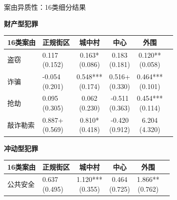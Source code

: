 \documentclass[aspectratio=169,10pt]{ctexbeamer}
\begin{document}
\begin{frame}[plain]{案由异质性：16类细分结果}
  \centering
  \scriptsize
  \begin{minipage}[t]{0.48\textwidth}
    \centering
    \textbf{财产型犯罪}
    \vspace{0.25em}
    \begin{tabular}{llcccc}
      \toprule
      16类案由 & 正规街区 & 城中村 & 中心 & 外围 \\
      \midrule
      盗窃 & \makecell{0.117\\(0.152)} & \makecell{0.163*\\(0.086)} & \makecell{0.183\\(0.181)} & \makecell{0.120**\\(0.058)} \\
      诈骗 & \makecell{-0.054\\(0.201)} & \makecell{0.548***\\(0.174)} & \makecell{0.516+\\(0.330)} & \makecell{0.464***\\(0.101)} \\
      抢劫 & \makecell{0.095\\(0.305)} & \makecell{0.062\\(0.230)} & \makecell{-0.511\\(0.363)} & \makecell{0.454***\\(0.114)} \\
      敲诈勒索 & \makecell{0.887+\\(0.569)} & \makecell{0.810*\\(0.418)} & \makecell{-0.420\\(0.912)} & \makecell{6.204\\(4.320)} \\
      \bottomrule
    \end{tabular}
  \end{minipage}
  \hfill
  \begin{minipage}[t]{0.48\textwidth}
    \centering
    \textbf{冲动型犯罪}
    \vspace{0.25em}
    \begin{tabular}{llcccc}
      \toprule
      16类案由 & 正规街区 & 城中村 & 中心 & 外围 \\
      \midrule
      公共安全 & \makecell{0.637\\(0.495)} & \makecell{1.120***\\(0.355)} & \makecell{0.464\\(0.725)} & \makecell{1.866**\\(0.762)} \\

\end{tabular}
\end{minipage}
\end{frame}
\end{document}
